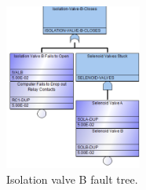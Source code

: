 \begin{figure}[H]
    \centering
    \includegraphics[width=0.4\textwidth]{3_identifying_gaps/benchmarking/datasets/figures/isolation_valve_b_fault_tree.png}
    \caption{Isolation valve B fault tree.}
    \label{fig:isolation_valve_b_fault_tree}
\end{figure}
